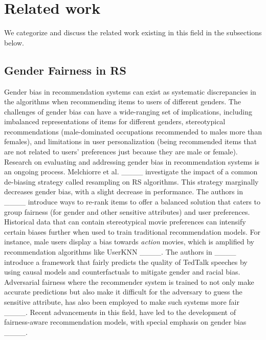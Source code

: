 \section{Related work}
% 
We categorize and discuss the related work existing in this field in the subsections below.
\subsection{Gender Fairness in RS}
Gender bias in recommendation systems can exist as systematic discrepancies in the algorithms when recommending items to users of different genders. The challenges of gender bias can have a wide-ranging set of implications, including imbalanced representations of items for different genders, stereotypical recommendations (male-dominated occupations recommended to males more than females), and limitations in user personalization (being recommended items that are not related to users' preferences just because they are male or female). Research on evaluating and addressing gender bias in recommendation systems is an ongoing process. Melchiorre et al. ____ investigate the impact of a common de-biasing strategy called resampling on RS algorithms. This strategy marginally decreases gender bias, with a slight decrease in performance. The authors in ____ introduce ways to re-rank items to offer a balanced solution that caters to group fairness (for gender and other sensitive attributes) and user preferences.
Historical data that can contain stereotypical movie preferences can intensify certain biases further when used to train traditional recommendation models. For instance, male users display a bias towards \textit{action} movies, which is amplified by recommendation algorithms like UserKNN ____. The authors in ____
introduce a framework that fairly predicts the quality of TedTalk speeches by using causal models and counterfactuals to mitigate gender and racial bias. Adversarial fairness where the recommender system is trained to not only make accurate predictions but also make it difficult for the adversary to guess the sensitive attribute, has also been employed to make such systems more fair ____. Recent advancements in this field, have led to the development of fairness-aware recommendation models, with special emphasis on gender bias ____.
